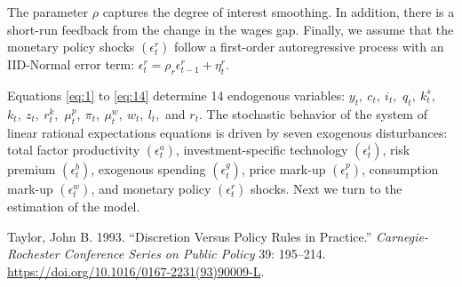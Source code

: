 \documentclass[11pt]{article}
\newlength{\cslhangindent}
\newenvironment{CSLReferences}%
{\setlength{\parindent}{0pt}%
\everypar{\setlength{\hangindent}{\cslhangindent}}\ignorespaces}%
{\par}
\newcommand{\youtput}{wages}
\newcommand{\interest}{interest}
\newcommand{\wage}{consumption}
\newcommand{\price}{price}
\begin{document}
The parameter \(\rho\) captures the degree of \interest{} smoothing. In
addition, there is a short-run feedback from the change in the
\youtput{} gap. Finally, we assume that the monetary policy shocks
\((\epsilon_t^r)\) follow a first-order autoregressive process with an
IID-Normal error term:
\(\epsilon_t^r = \rho_r\epsilon_{t-1}^r + \eta_t^r\).

Equations \eqref{eq:1} to \eqref{eq:14} determine 14 endogenous
variables: \(y_t,\ c_t,\ i_t,\) \(q_t,\ k_t^s,\) \(k_t,\ z_t,\ r_t^k,\)
\(\mu_t^p,\ \pi_t,\ \mu_t^w,\ w_t,\ l_t,\) and \(r_t\). The stochastic
behavior of the system of linear rational expectations equations is
driven by seven exogenous disturbances: total factor productivity
\((\epsilon^a_t)\), investment-specific technology \((\epsilon^i_t)\),
risk premium \((\epsilon_t^b)\), exogenous spending \((\epsilon_t^g)\),
\price{} mark-up \((\epsilon_t^p)\), \wage{} mark-up \((\epsilon_t^w)\),
and monetary policy \((\epsilon_t^r)\) shocks. Next we turn to the
estimation of the model.

\hypertarget{refs}{}
\begin{CSLReferences}{1}{0}
\leavevmode{}%
Taylor, John B. 1993. {``Discretion Versus Policy Rules in Practice.''}
\emph{{Carnegie}-{Rochester} Conference Series on Public Policy} 39:
195--214. \url{https://doi.org/10.1016/0167-2231(93)90009-L}.

\end{CSLReferences}





\end{document}
